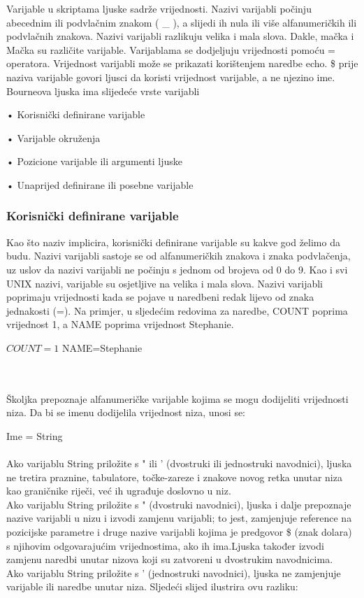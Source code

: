 \documentclass[11pt]{book}
\begin{document}
Varijable u skriptama ljuske sadrže vrijednosti. Nazivi varijabli počinju abecednim ili podvlačnim znakom ( \_ ), a slijedi ih nula ili više alfanumeričkih ili podvlačnih znakova. Nazivi varijabli razlikuju velika i mala slova. Dakle, mačka i Mačka su različite varijable. Varijablama se dodjeljuju vrijednosti pomoću = operatora. Vrijednost varijabli može se prikazati korištenjem naredbe echo. \$ prije naziva varijable govori ljusci da koristi vrijednost varijable, a ne njezino ime.\\

Bourneova ljuska ima slijedeće vrste varijabli

•	Korisnički definirane varijable 

•	Varijable okruženja 

•	Pozicione varijable ili argumenti ljuske

•	Unaprijed definirane ili posebne varijable

\subsubsection{Korisnički definirane varijable}
Kao što naziv implicira, korisnički definirane varijable su kakve god želimo da budu. Nazivi varijabli sastoje se od alfanumeričkih znakova i znaka podvlačenja, uz uslov da nazivi varijabli ne počinju s jednom od brojeva od 0 do 9. Kao i svi UNIX nazivi, varijable su osjetljive na velika i mala slova. Nazivi varijabli poprimaju vrijednosti kada se pojave u naredbeni redak lijevo od znaka jednakosti (=). Na primjer, u sljedećim redovima za naredbe, COUNT poprima vrijednost 1, a NAME poprima vrijednost Stephanie.\\

\begin{shortlisting}
$ COUNT=1
$ NAME=Stephanie
\end{shortlisting}\\\\
Školjka prepoznaje alfanumeričke varijable kojima se mogu dodijeliti vrijednosti niza. Da bi se imenu dodijelila vrijednost niza, unosi se:\\
\par{Ime = String}\\\\
Ako varijablu String priložite s " ili ' (dvostruki ili jednostruki navodnici), ljuska ne tretira praznine, tabulatore, točke-zareze i znakove novog retka unutar niza kao graničnike riječi, već ih ugrađuje doslovno u niz.\\ 
Ako varijablu String priložite s " (dvostruki navodnici), ljuska i dalje prepoznaje nazive varijabli u nizu i izvodi zamjenu varijabli; to jest, zamjenjuje reference na pozicijske parametre i druge nazive varijabli kojima je predgovor \$ (znak dolara) s njihovim odgovarajućim vrijednostima, ako ih ima.Ljuska također izvodi zamjenu naredbi unutar nizova koji su zatvoreni u dvostrukim navodnicima.\\
Ako varijablu String priložite s ' (jednostruki navodnici), ljuska ne zamjenjuje varijable ili naredbe unutar niza. Sljedeći slijed ilustrira ovu razliku:\\
\end{document}
